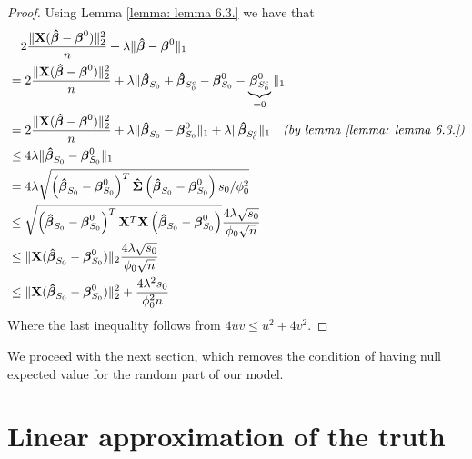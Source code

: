 \begin{proof}
    Using Lemma \ref{lemma: lemma 6.3.} we have that
    \begin{align*}
         & \quad 2 \frac{\|\mathbf{X}(\boldsymbol{\hat{\beta}}-\boldsymbol{\beta}^{0})\|_{2}^{2}}{n} + \lambda\|\boldsymbol{\hat{\beta}}-\boldsymbol{\beta}^{0}\|_{1}                                                                                                      \\
         & = 2 \frac{\|\mathbf{X}(\boldsymbol{\hat{\beta}}-\boldsymbol{\beta}^{0})\|_{2}^{2}}{n} + \lambda \| \boldsymbol{\hat{\beta}}_{S_0} + \boldsymbol{\hat{\beta}}_{S_{0}^{c}} - \boldsymbol{\beta}^{0}_{S_0} - \underbrace{\boldsymbol{\beta}^{0}_{S_0^c}}_{=0} \|_{1}                              \\
         & = 2 \frac{\|\mathbf{X}(\boldsymbol{\hat{\beta}}-\boldsymbol{\beta}^{0})\|_{2}^{2}}{n} + \lambda \| \boldsymbol{\hat{\beta}}_{S_0} - \boldsymbol{\beta}^{0}_{S_0} \|_{1} + \lambda \| \boldsymbol{\hat{\beta}}_{S_{0}^{c}} \|_1 \quad \textit{(by lemma \ref{lemma: lemma 6.3.})} \\
         & \leq 4 \lambda \|\boldsymbol{\hat{\beta}}_{S_{0}} - \boldsymbol{\beta}_{S_{0}}^{0} \|_{1}                                                                                                                                \\
         & = 4 \lambda \sqrt{\left( \boldsymbol{\hat{\beta}}_{S_{0}} - \boldsymbol{\beta}_{S_{0}}^{0} \right)^{T} \boldsymbol{\hat{\Sigma}} \left( \boldsymbol{\hat{\beta}}_{S_{0}} - \boldsymbol{\beta}_{S_{0}}^{0}  \right) s_{0} / \phi_{0}^{2}}                                  \\
         & \leq \sqrt{\left( \boldsymbol{\hat{\beta}}_{S_{0}} - \boldsymbol{\beta}_{S_{0}}^{0} \right)^{T} \mathbf{X}^T \mathbf{X} \left( \boldsymbol{\hat{\beta}}_{S_{0}} - \boldsymbol{\beta}_{S_{0}}^{0}  \right)} \frac{4 \lambda \sqrt{s_{0}}}{\phi_{0} \sqrt{n}}             \\
         & \leq \| \mathbf{X} ( \boldsymbol{\hat{\beta}}_{S_{0}} - \boldsymbol{\beta}_{S_{0}}^{0} ) \|_2 \frac{4 \lambda \sqrt{s_{0}}}{\phi_{0} \sqrt{n}}                                                                                   \\
         & \leq \| \mathbf{X} ( \boldsymbol{\hat{\beta}}_{S_{0}} - \boldsymbol{\beta}_{S_{0}}^{0} ) \|^2_2 + \frac{4 \lambda^2 s_{0}}{\phi^2_{0} n}                                                                                         \\
    \end{align*}
    Where the last inequality follows from $4uv \leq u^2 + 4v^2$.
\end{proof}
We proceed with the next section, which removes the condition of having null expected value for the random part of our model.

\section{Linear approximation of the truth}

